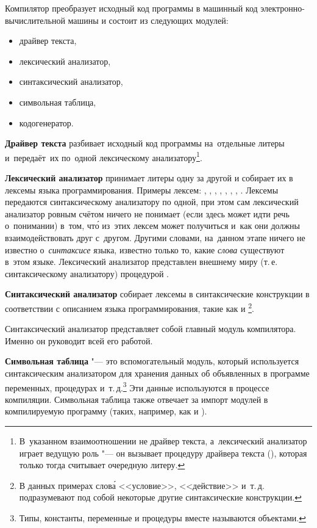 Компилятор преобразует исходный код программы в машинный код
электронно-вычислительной машины и состоит из следующих модулей:

\begin{itemize}
  \item драйвер текста,
  \item лексический анализатор,
  \item синтаксический анализатор,
  \item символьная таблица,
  \item кодогенератор.
\end{itemize}

{\bfseries Драйвер текста} разбивает исходный код программы
на~отдельные литеры и~передаёт~их по~одной лексическому
анализатору\footnote{В~указанном взаимоотношении не драйвер
текста, а~лексический анализатор играет ведущую роль "--- он
вызывает процедуру драйвера текста (), которая
только тогда считывает очередную литеру.}.

{\bfseries Лексический анализатор} принимает литеры одну за другой
и собирает их в лексемы языка программирования. Примеры лексем:
, , \kod{+}, \kod{:=}, ,
, \kod{>=}, .
Лексемы передаются синтаксическому анализатору по одной, при этом сам
лексический анализатор ровным счётом ничего не понимает (если здесь
может идти речь о~понимании) в~том, чт\'{о}
из~этих лексем может получиться и~как они должны взаимодействовать
друг с~другом. Другими словами, на~данном этапе ничего не известно
о~{\em синтаксисе} языка, известно только то, какие {\em слова}
существуют в~этом языке.
Лексический анализатор представлен внешнему миру
(т.\,е.\,синтаксическому анализатору) процедурой .

{\bfseries Синтаксический анализатор} собирает лексемы в синтаксические
конструкции в соответствии с описанием языка программирования,
такие как  и
\footnote{В данных примерах слов\'{а}
<<условие>>, <<действие>> и~т.\,д. подразумевают под собой некоторые
другие синтаксические конструкции.}.

Синтаксический анализатор представляет собой главный модуль компилятора.
Именно он руководит всей его работой.

{\bfseries Символьная таблица} "--- это вспомогательный модуль, который
используется синтаксическим анализатором для хранения данных об
объявленных в программе переменных, процедурах и~т.\,д.\footnote{Типы,
константы, переменные и процедуры вместе называются объектами.}
Эти данные используются в процессе компиляции. Символьная таблица также
отвечает за импорт модулей в компилируемую программу (таких, например,
как  и ).

